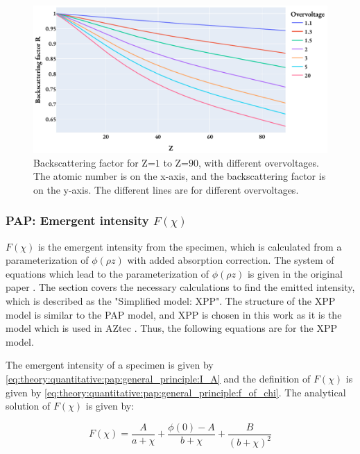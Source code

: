 \begin{figure}[htbp]
    \centering
    \includegraphics[width=0.8\linewidth]{figures/PAP_backscattering_factor.pdf}
    \caption{
        Backscattering factor for Z=$1$ to Z=$90$, with different overvoltages.
        The atomic number is on the x-axis, and the backscattering factor is on the y-axis.
        The different lines are for different overvoltages.
    }
    \label{fig:PAP:backscattering_factor}
\end{figure}





\subsubsection{PAP: Emergent intensity $F(\chi)$}
\label{sec:theory:quantitative:pap:emergent_intensity}

$F(\chi)$ is the emergent intensity from the specimen, which is calculated from a parameterization of $\phi(\rho z)$ with added absorption correction.
The system of equations which lead to the parameterization of $\phi(\rho z)$ is given in the original paper \cite{pap_1991}.
The section covers the necessary calculations to find the emitted intensity, which is described as the "Simplified model: XPP".
The structure of the XPP model is similar to the PAP model, and XPP is chosen in this work as it is the model which is used in AZtec \cite{oxford_blog_XPP}.
Thus, the following equations are for the XPP model.


The emergent intensity of a specimen is given by \cref{eq:theory:quantitative:pap:general_principle:I_A} and the definition of $F(\chi)$ is given by \cref{eq:theory:quantitative:pap:general_principle:f_of_chi}. The analytical solution of $F(\chi)$ is given by:



\begin{equation}
    \label{eq:theory:quantitative:pap:F_of_chi}
    F(\chi) = \frac{A}{a+ \chi} + \frac{\phi(0) - A}{b + \chi} + \frac{B}{(b + \chi)^2}
\end{equation}

